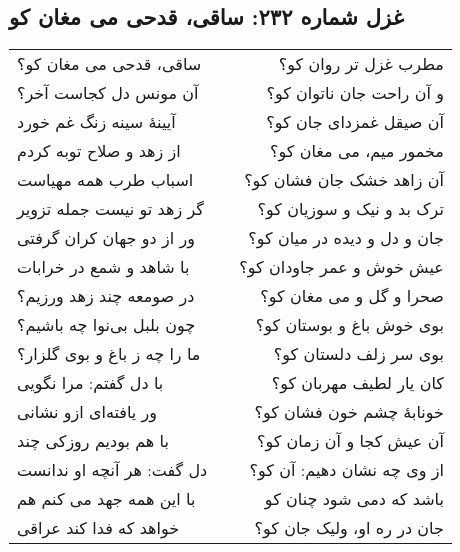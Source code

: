 \begin{center}
\section*{غزل شماره ۲۳۲: ساقی، قدحی می مغان کو}
\label{sec:232}
\begin{longtable}{l p{0.5cm} r}
ساقی، قدحی می مغان کو؟
&&
مطرب غزل تر روان کو؟
\\
آن مونس دل کجاست آخر؟
&&
و آن راحت جان ناتوان کو؟
\\
آیینهٔ سینه زنگ غم خورد
&&
آن صیقل غمزدای جان کو؟
\\
از زهد و صلاح توبه کردم
&&
مخمور میم، می مغان کو؟
\\
اسباب طرب همه مهیاست
&&
آن زاهد خشک جان فشان کو؟
\\
گر زهد تو نیست جمله تزویر
&&
ترک بد و نیک و سوزیان کو؟
\\
ور از دو جهان کران گرفتی
&&
جان و دل و دیده در میان کو؟
\\
با شاهد و شمع در خرابات
&&
عیش خوش و عمر جاودان کو؟
\\
در صومعه چند زهد ورزیم؟
&&
صحرا و گل و می مغان کو؟
\\
چون بلبل بی‌نوا چه باشیم؟
&&
بوی خوش باغ و بوستان کو؟
\\
ما را چه ز باغ و بوی گلزار؟
&&
بوی سر زلف دلستان کو؟
\\
با دل گفتم: مرا نگویی
&&
کان یار لطیف مهربان کو؟
\\
ور یافته‌ای ازو نشانی
&&
خونابهٔ چشم خون فشان کو؟
\\
با هم بودیم روزکی چند
&&
آن عیش کجا و آن زمان کو؟
\\
دل گفت: هر آنچه او ندانست
&&
از وی چه نشان دهیم: آن کو؟
\\
با این همه جهد می کنم هم
&&
باشد که دمی شود چنان کو
\\
خواهد که فدا کند عراقی
&&
جان در ره او، ولیک جان کو؟
\\
\end{longtable}
\end{center}
